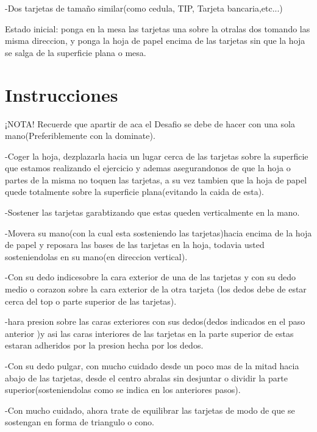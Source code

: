 \documentclass{article}
\begin{document}
    -Dos tarjetas de tamaño similar(como cedula, TIP, Tarjeta bancaria,etc...)
    
    Estado inicial: ponga en la mesa las tarjetas una sobre la otralas dos tomando las misma direccion, y ponga la hoja de papel encima de las tarjetas sin que la hoja se salga de la superficie plana o mesa.

\section{Instrucciones} \label{contenido}
    ¡NOTA! Recuerde que apartir de aca el Desafio se debe de hacer con una sola mano(Preferiblemente con la dominate).
    
    
    -Coger la hoja, dezplazarla hacia un lugar cerca de las tarjetas sobre la superficie que estamos realizando el ejercicio y ademas asegurandonos de que la hoja o partes de la misma no toquen las tarjetas, a su vez tambien que la hoja de papel quede totalmente sobre la superficie plana(evitando la caida de esta).

    
    -Sostener las tarjetas garabtizando que estas queden verticalmente en la mano.

    
    -Movera su mano(con la cual esta sosteniendo las tarjetas)hacia encima de la hoja de papel y reposara las bases de las tarjetas en la hoja, todavia    usted sosteniendolas en su mano(en direccion vertical).
 
    
    -Con su dedo indicesobre la cara exterior de una de las tarjetas y con su dedo medio o corazon sobre la cara exterior de la otra tarjeta (los dedos debe de estar cerca del top o parte superior de las tarjetas).

    
    -hara presion sobre las caras exteriores con sus dedos(dedos indicados en el paso anterior )y asi las caras interiores de las tarjetas en la parte superior de estas estaran adheridos por la presion hecha por los dedos.
   
    
    -Con su dedo pulgar, con mucho cuidado desde un poco mas de la mitad hacia abajo de las tarjetas, desde el centro abralas sin desjuntar o dividir la parte superior(sosteniendolas como se indica en los anteriores pasos).
    
    
    -Con mucho cuidado, ahora trate de equilibrar las tarjetas de modo de que se sostengan en forma de triangulo o cono.
\end{document}
